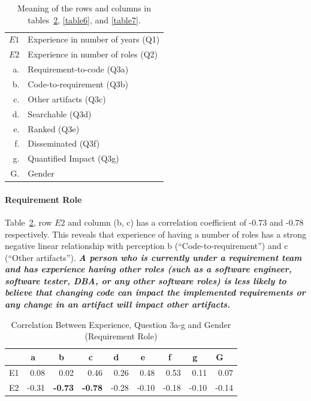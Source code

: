 \documentclass[conference]{IEEEtran}
\begin{document}
\begin{table}
\centering
\caption{Meaning of the rows and columns in tables~\ref{table5},
  \ref{table6}, and \ref{table7}.}
\label{tab:legend}
\begin{tabular}{|rl|}
\hline
$E1$ & Experience in number of years  (Q1)\\
$E2$ & Experience in number of roles (Q2)\\
a. & Requirement-to-code (Q3a)\\ 
b. & Code-to-requirement (Q3b)\\
c. & Other artifacts (Q3c)\\
d. & Searchable (Q3d)\\
e. & Ranked (Q3e)\\
f. & Disseminated (Q3f)\\
g. & Quantified Impact (Q3g)\\
G. & Gender\\
\hline
\end{tabular}
\end{table}

\paragraph{Requirement Role}

Table~\ref{table5}, row $E2$ and column (b, c) has a correlation
coefficient of -0.73 and -0.78 respectively. This reveals that
experience of having a number of roles has a strong negative linear
relationship with perception b (``Code-to-requirement'') and c
(``Other artifacts''). \textbf{\textit{A person who is currently under
    a requirement team and has experience having other roles (such as
    a software engineer, software tester, DBA, or any other software
    roles) is less likely to believe that changing code can impact the
    implemented requirements or any change in an artifact will impact
    other artifacts.}}

\begin{table}[ht]
\centering
\caption{Correlation Between Experience, Question 3a-g and Gender (Requirement Role) }
\label{table5}
\begin{tabular}{|c|rrrrrrr|r|}
\hline
\rowcolor{lightgray} & a~~ & b~~ & c~~ & d~~ & e~~ & f~~ & g~~ & G~~ \\
\hline
E1 & 0.08   & 0.02 & 0.46 & 0.26 & 0.48 & 0.53 & 0.11 & 0.07  \\
\hline
E2 & -0.31   & \textbf{-0.73} & \textbf{-0.78}  & -0.28 & -0.10 & -0.18 & -0.10 & -0.14 \\
\hline
\end{tabular}
\end{table}
\end{document}
